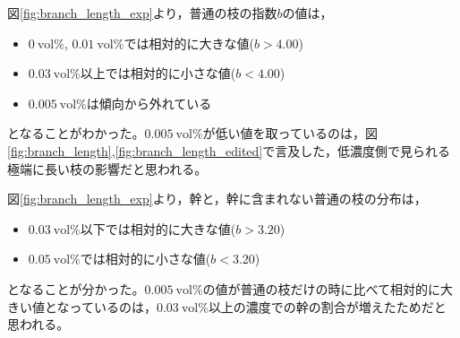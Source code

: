 \documentclass[autodetect-engine,dvi=dvipdfmx,a4paper,ja=standard,oneside,openany,11pt]{bxjsbook}
\begin{document}
図\ref{fig:branch_length_exp}より，普通の枝の指数$b$の値は，
\begin{itemize}
  \item $\SI{0}{\mathrm{vol}\%}$, $\SI{0.01}{\mathrm{vol}\%}$では相対的に大きな値($b>4.00$)
  \item $\SI{0.03}{\mathrm{vol}\%}$以上では相対的に小さな値($b<4.00$)
  \item $\SI{0.005}{\mathrm{vol}\%}$は傾向から外れている
\end{itemize}
となることがわかった。$\SI{0.005}{\mathrm{vol}\%}$が低い値を取っているのは，図\ref{fig:branch_length},\ref{fig:branch_length_edited}で言及した，低濃度側で見られる極端に長い枝の影響だと思われる。

図\ref{fig:branch_length_exp}より，幹と，幹に含まれない普通の枝の分布は，
\begin{itemize}
  \item $\SI{0.03}{\mathrm{vol}\%}$以下では相対的に大きな値($b>3.20$)
  \item $\SI{0.05}{\mathrm{vol}\%}$では相対的に小さな値($b<3.20$)
\end{itemize}
となることが分かった。$\SI{0.005}{\mathrm{vol}\%}$の値が普通の枝だけの時に比べて相対的に大きい値となっているのは，$\SI{0.03}{\mathrm{vol}\%}$以上の濃度での幹の割合が増えたためだと思われる。
\ifdraft{
  
  
}{}
\end{document}
